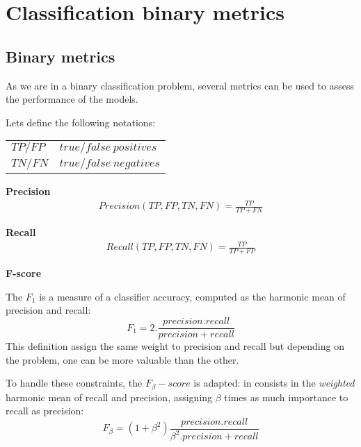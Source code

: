 \chapter{Classification binary metrics}



\section{Binary metrics}

As we are in a binary classification problem, several metrics can be used to assess the performance of the models.

Lets define the following notations:

{\ttfamily
\begin{table}[H]
    \centering
    \begin{tabular}{ll}
        \toprule
        $TP / FP$          &    $true/false\ positives$ \\
        $TN / FN$       &    $true/false\ negatives$  \\
        \bottomrule
    \end{tabular}
\end{table}
}

\textbf{Precision}
\begin{align}
    Precision(TP, FP, TN, FN) = \frac{TP}{TP + FN}
\end{align}

\textbf{Recall}
\begin{align}
    Recall(TP, FP, TN, FN) = \frac{TP}{TP + FP}
\end{align}

\textbf{F-score}

The $F_1$ is a measure of a classifier accuracy, computed as the harmonic mean of precision and recall: $$F_1= 2. \frac{precision.recall}{precision+recall}$$\tabularnewline
This definition assign the same weight to precision and recall but depending on the problem, one can be more valuable than the other.

To handle these constraints, the $F_\beta-score$ is adapted: in consists in the \textit{weighted} harmonic mean of recall and precision, assigning $\beta$ times as much importance to recall as precision: $$F_\beta = (1+\beta^2) \frac{precision.recall}{\beta^2.precision+recall}$$
